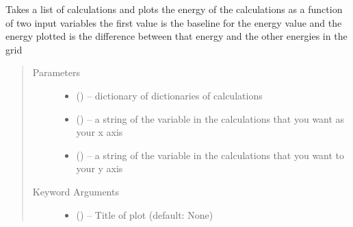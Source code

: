 \documentclass[letterpaper,10pt,english]{sphinxmanual}
\begin{document}

\begin{fulllineitems}
\label{\detokenize{plot:plot.grid_plot}}
\end{fulllineitems}


\begin{fulllineitems}
\label{\detokenize{plot:plot.interpolatePlot}}
Takes a list of calculations and plots the energy of the calculations as a function of two input variables
the first value is the baseline for the energy value and the energy plotted is the difference between that
energy and the other energies in the grid
\begin{quote}\begin{description}
\item[{Parameters}] \leavevmode\begin{itemize}
\item {} 
 () -- dictionary of dictionaries of calculations

\item {} 
 () -- a string of the variable in the calculations that you want as your x axis

\item {} 
 () -- a string of the variable in the calculations that you want to your y axis

\end{itemize}

\item[{Keyword Arguments}] \leavevmode\begin{itemize}
\item {} 
 () -- Title of plot (default: None)


\end{itemize}
\end{description}
\end{quote}
\end{fulllineitems}
\end{document}

